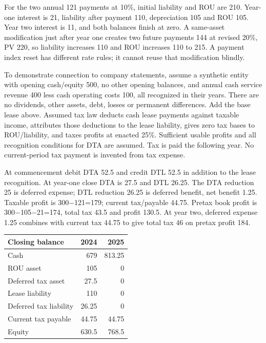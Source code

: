 For the two annual 121 payments at 10\%, initial liability and ROU are 210. Year-one interest is 21, liability after payment 110, depreciation 105 and ROU 105. Year two interest is 11, and both balances finish at zero. A same-asset modification just after year one creates two future payments 144 at revised 20\%, PV 220, so liability increases 110 and ROU increases 110 to 215. A payment index reset has different rate rules; it cannot reuse that modification blindly.

To demonstrate connection to company statements, assume a synthetic entity with opening cash/equity 500, no other opening balances, and annual cash service revenue 400 less cash operating costs 100, all recognized in their years. There are no dividends, other assets, debt, losses or permanent differences. Add the base lease above. Assumed tax law deducts cash lease payments against taxable income, attributes those deductions to the lease liability, gives zero tax bases to ROU/liability, and taxes profits at enacted 25\%. Sufficient usable profits and all recognition conditions for DTA are assumed. Tax is paid the following year. No current-period tax payment is invented from tax expense.

At commencement debit DTA 52.5 and credit DTL 52.5 in addition to the lease recognition. At year-one close DTA is 27.5 and DTL 26.25. The DTA reduction 25 is deferred expense; DTL reduction 26.25 is deferred benefit, net benefit 1.25. Taxable profit is 300\ensuremath{-}121=179; current tax/payable 44.75. Pretax book profit is 300\ensuremath{-}105\ensuremath{-}21=174, total tax 43.5 and profit 130.5. At year two, deferred expense 1.25 combines with current tax 44.75 to give total tax 46 on pretax profit 184.

\begin{center}
\begin{tabular}{lrr}
\toprule Closing balance & 2024 & 2025\\\midrule
Cash & 679 & 813.25\\
ROU asset & 105 & 0\\
Deferred tax asset & 27.5 & 0\\
Lease liability & 110 & 0\\
Deferred tax liability & 26.25 & 0\\
Current tax payable & 44.75 & 44.75\\
Equity & 630.5 & 768.5\\\bottomrule
\end{tabular}
\end{center}


